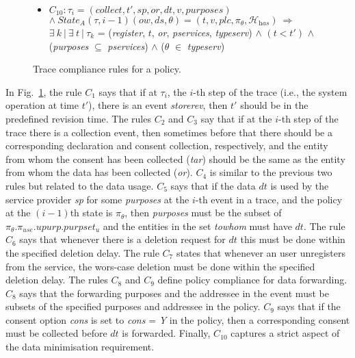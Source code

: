 \documentclass[a4paper]{article}
\begin{document}
\begin{figure}[htbp]
{\begin{minipage}{11.87 cm}
\begin{itemize}
\item $C_{10}: \tau_i = (\textit{collect}, t', sp, or, dt, v,   \textit{purposes})$ $ 
\wedge \ \textit{State}_A(\tau, i-1)(ow, ds, \theta) = (t, v, \textit{plc}, \pi_{\theta}, \mathcal{H}_{\textit{has}})\ \Longrightarrow$ $\exists \ k \ | \ \exists \ t \ | \ \tau_k$ =  (\textit{register}, $t$, \textit{or}, \textit{pservices}, \textit{typeserv}) $\wedge$ $(t < t')$   $\wedge$ (\textit{purposes} $\subseteq$ \textit{pservices}) $\wedge$ ($\theta$ $\in$ \textit{typeserv})\\
\end{itemize}

\end{minipage}
}
\caption{Trace compliance rules for a policy.}\label{fig:compsn0}
\end{figure}

In Fig.~\ref{fig:compsn0}, the rule $C_1$ says that if at  $\tau_i$, the $i$-th step of the trace (i.e., the system operation at time $t'$), there is an event  \textit{storerev}, then $t'$ should be in the predefined revision time. The rules $C_2$ and $C_3$ say that if at the $i$-th step of the trace there is a collection event, then sometimes before that there should be a corresponding declaration and consent collection, respectively, and the entity from whom the consent has been collected (\textit{tar}) should be the same as the entity from whom the data has been collected (\textit{or}).  $C_4$ is similar to the previous two rules but related to the data usage.  $C_5$ says that if the data $dt$ is used by the service provider \textit{sp} for some \textit{purposes} at the $i$-th event in a trace, and the policy at the $(i-1)$th state is  $\pi_{\theta}$, then \textit{purposes} must be the subset of $\pi_{\theta}.\pi_{use}.upurp.purpset_u$ and the entities in the set \textit{towhom} must have $dt$. The rule $C_6$ says that whenever there is a deletion request for $dt$ this must be done within the specified deletion delay. The rule $C_7$ states that whenever an user unregisters from the service, the wors-case deletion must be done within the specified deletion delay. The rules $C_8$ and $C_{9}$ define policy compliance for data forwarding. $C_8$ says that the forwarding purposes and the addressee in the event must be subsets of the specified purposes and addressee in the policy. $C_9$ says that if the consent option \textit{cons} is set to \textit{cons} = \textit{Y} in the policy, then a corresponding consent must be collected before $dt$ is forwarded. Finally, $C_{10}$ captures a strict aspect of the data minimisation requirement.  
\end{document}
